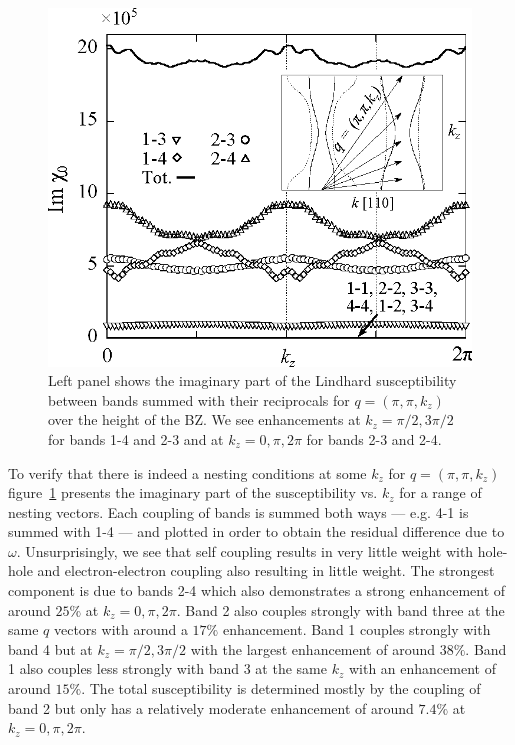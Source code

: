 \begin{figure}[htbp]
    \begin{center}
        \includegraphics[scale=0.7]{Chapter-dHvABaFe2P2/Figures/Susceptibility/NestingVector/NestingVector}
        \caption{Left panel shows the imaginary part of the Lindhard susceptibility between bands summed with their reciprocals for $q=(\pi, \pi, k_z)$ over the height of the \ac{BZ}. We see enhancements at $k_z=\pi/2,3\pi/2$ for bands 1-4 and 2-3 and at $k_z=0,\pi,2\pi$ for bands 2-3 and 2-4.}
        \label{Fig:ResD:NestingVector}
    \end{center}
\end{figure}
To verify that there is indeed a nesting conditions at some $k_z$ for $q=(\pi, \pi, k_z)$ figure~\ref{Fig:ResD:NestingVector} presents the imaginary part of the susceptibility vs. $k_z$ for a range of nesting vectors. Each coupling of bands is summed both ways --- e.g. 4-1 is summed with 1-4 --- and plotted in order to obtain the residual difference due to $\omega$. Unsurprisingly, we see that self coupling results in very little weight with hole-hole and electron-electron coupling also resulting in little weight. The strongest component is due to bands 2-4 which also demonstrates a strong enhancement of around $25\%$ at $k_z=0,\pi,2\pi$. Band 2 also couples strongly with band three at the same $q$ vectors with around a $17\%$ enhancement. Band 1 couples strongly with band 4 but at $k_z=\pi/2,3\pi/2$ with the largest enhancement of around $38\%$. Band 1 also couples less strongly with band $3$ at the same $k_z$ with an enhancement of around $15\%$. The total susceptibility is determined mostly by the coupling of band 2 but only has a relatively moderate enhancement of around $7.4\%$ at $k_z=0,\pi,2\pi$.

